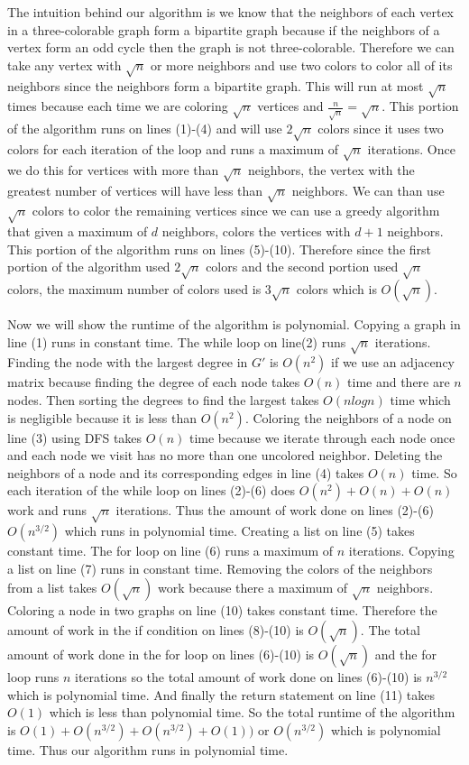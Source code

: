\documentclass[11pt]{article}
\begin{document}
\begin{enumerate}
    The intuition behind our algorithm is we know that the neighbors of each vertex in a three-colorable graph form a bipartite graph because if the neighbors of a vertex form an odd cycle then the graph is not three-colorable.  Therefore we can take any vertex with $\sqrt{n}$ or more neighbors and use two colors to color all of its neighbors since the neighbors form a bipartite graph.  This will run at most $\sqrt{n}$ times because each time we are coloring $\sqrt{n}$ vertices and $\frac{n}{\sqrt{n}} = \sqrt{n}$.  This portion of the algorithm runs on lines (1)-(4) and will use $2\sqrt{n}$ colors since it uses two colors for each iteration of the loop and runs a maximum of $\sqrt{n} $ iterations.  Once we do this for vertices with more than $\sqrt{n}$ neighbors, the vertex with the greatest number of vertices will have less than $\sqrt{n}$ neighbors.  We can than use $\sqrt{n}$ colors to color the remaining vertices since we can use a greedy algorithm that given a maximum of $d$ neighbors, colors the vertices with $d+1$ neighbors. This portion of the algorithm runs on lines (5)-(10).  Therefore since the first portion of the algorithm used $2 \sqrt{n}$ colors and the second portion used $\sqrt{n}$ colors, the maximum number of colors used is $3\sqrt{n}$ colors which is $O(\sqrt{n})$. 
    
    Now we will show the runtime of the algorithm is polynomial.  Copying a graph in line (1) runs in constant time.  The while loop on line(2) runs $\sqrt{n}$ iterations.  Finding the node with the largest degree in $G'$ is $O(n^2)$ if we use an adjacency matrix because finding the degree of each node takes $O(n)$ time and there are $n$ nodes.  Then sorting the degrees to find the largest takes $O(nlogn)$ time which is negligible because it is less than $O(n^2)$.  Coloring the neighbors of a node on line (3) using DFS takes $O(n)$ time because we iterate through each node once and each node we visit has no more than one uncolored neighbor.  Deleting the neighbors of a node and its corresponding edges in line (4) takes $O(n)$ time.  So each iteration of the while loop on lines (2)-(6) does $O(n^2)+O(n)+O(n)$ work and runs $\sqrt{n}$ iterations.  Thus the amount of work done on lines (2)-(6) $O(n^{3/2})$ which runs in polynomial time.  Creating a list on line (5) takes constant time.  The for loop on line (6) runs a maximum of $n$ iterations.  Copying a list on line (7) runs in constant time.  Removing the colors of the neighbors from a list takes $O(\sqrt{n})$ work because there a maximum of $\sqrt{n}$ neighbors.  Coloring a node in two graphs on line (10) takes constant time.  Therefore the amount of work in the if condition on lines (8)-(10) is $O(\sqrt{n})$.  The total amount of work done in the for loop on lines (6)-(10) is $O(\sqrt{n})$ and the for loop runs $n$ iterations so the total amount of work done on lines (6)-(10) is $n^{3/2}$ which is polynomial time.  And finally the return statement on line (11) takes $O(1)$ which is less than polynomial time.  So the total runtime of the algorithm is $O(1)+O(n^{3/2})+O(n^{3/2})+O(1))$ or $O(n^{3/2})$ which is polynomial time.  Thus our algorithm runs in polynomial time.


\end{enumerate}
\end{document}
